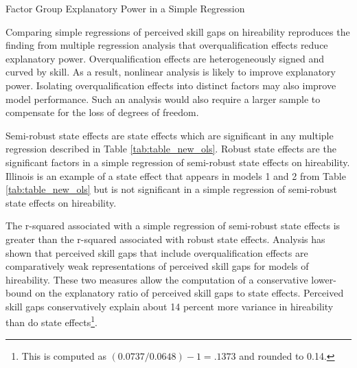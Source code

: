 \documentclass[review]{elsarticle}
\begin{document}
\begin{table}
    \caption{Factor Group Explanatory Power in a Simple Regression}
    \resizebox{\columnwidth}{!}{
        
    }
    \label{tab:explantory_power}
\end{table}

Comparing simple regressions of perceived skill gaps on hireability reproduces the finding from multiple regression analysis that overqualification effects reduce explanatory power.
Overqualification effects are heterogeneously signed and curved by skill. As a result, nonlinear analysis is likely to improve explanatory power. Isolating overqualification effects into distinct factors may also improve model performance.
Such an analysis would also require a larger sample to compensate for the loss of degrees of freedom.

Semi-robust state effects are state effects which are significant in any multiple regression described in Table \ref{tab:table_new_ols}.
Robust state effects are the significant factors in a simple regression of semi-robust state effects on hireability.
Illinois is an example of a state effect that appears in models 1 and 2 from Table \ref{tab:table_new_ols} but is not significant in a simple regression of semi-robust state effects on hireability.

The r-squared associated with a simple regression of semi-robust state effects is greater than the r-squared associated with robust state effects.
Analysis has shown that perceived skill gaps that include overqualification effects are comparatively weak representations of perceived skill gaps for models of hireability.
These two measures allow the computation of a conservative lower-bound on the explanatory ratio of perceived skill gaps to state effects.
Perceived skill gaps conservatively explain about 14 percent more variance in hireability than do state effects\footnote{
    This is computed as $(0.0737 / 0.0648) - 1 = .1373$ and rounded to 0.14.
}.
\end{document}
